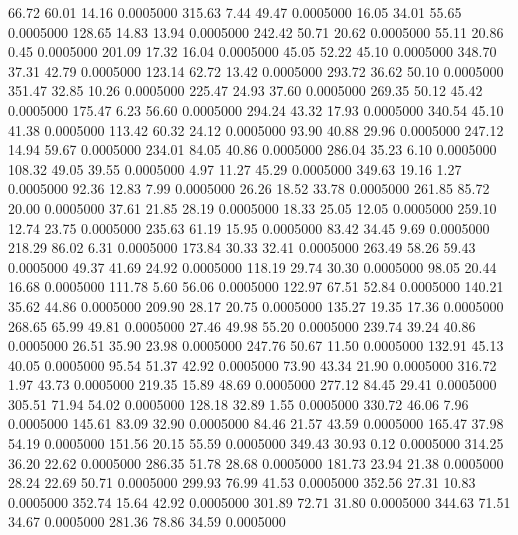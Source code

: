   66.72   60.01   14.16   0.0005000
 315.63    7.44   49.47   0.0005000
  16.05   34.01   55.65   0.0005000
 128.65   14.83   13.94   0.0005000
 242.42   50.71   20.62   0.0005000
  55.11   20.86    0.45   0.0005000
 201.09   17.32   16.04   0.0005000
  45.05   52.22   45.10   0.0005000
 348.70   37.31   42.79   0.0005000
 123.14   62.72   13.42   0.0005000
 293.72   36.62   50.10   0.0005000
 351.47   32.85   10.26   0.0005000
 225.47   24.93   37.60   0.0005000
 269.35   50.12   45.42   0.0005000
 175.47    6.23   56.60   0.0005000
 294.24   43.32   17.93   0.0005000
 340.54   45.10   41.38   0.0005000
 113.42   60.32   24.12   0.0005000
  93.90   40.88   29.96   0.0005000
 247.12   14.94   59.67   0.0005000
 234.01   84.05   40.86   0.0005000
 286.04   35.23    6.10   0.0005000
 108.32   49.05   39.55   0.0005000
   4.97   11.27   45.29   0.0005000
 349.63   19.16    1.27   0.0005000
  92.36   12.83    7.99   0.0005000
  26.26   18.52   33.78   0.0005000
 261.85   85.72   20.00   0.0005000
  37.61   21.85   28.19   0.0005000
  18.33   25.05   12.05   0.0005000
 259.10   12.74   23.75   0.0005000
 235.63   61.19   15.95   0.0005000
  83.42   34.45    9.69   0.0005000
 218.29   86.02    6.31   0.0005000
 173.84   30.33   32.41   0.0005000
 263.49   58.26   59.43   0.0005000
  49.37   41.69   24.92   0.0005000
 118.19   29.74   30.30   0.0005000
  98.05   20.44   16.68   0.0005000
 111.78    5.60   56.06   0.0005000
 122.97   67.51   52.84   0.0005000
 140.21   35.62   44.86   0.0005000
 209.90   28.17   20.75   0.0005000
 135.27   19.35   17.36   0.0005000
 268.65   65.99   49.81   0.0005000
  27.46   49.98   55.20   0.0005000
 239.74   39.24   40.86   0.0005000
  26.51   35.90   23.98   0.0005000
 247.76   50.67   11.50   0.0005000
 132.91   45.13   40.05   0.0005000
  95.54   51.37   42.92   0.0005000
  73.90   43.34   21.90   0.0005000
 316.72    1.97   43.73   0.0005000
 219.35   15.89   48.69   0.0005000
 277.12   84.45   29.41   0.0005000
 305.51   71.94   54.02   0.0005000
 128.18   32.89    1.55   0.0005000
 330.72   46.06    7.96   0.0005000
 145.61   83.09   32.90   0.0005000
  84.46   21.57   43.59   0.0005000
 165.47   37.98   54.19   0.0005000
 151.56   20.15   55.59   0.0005000
 349.43   30.93    0.12   0.0005000
 314.25   36.20   22.62   0.0005000
 286.35   51.78   28.68   0.0005000
 181.73   23.94   21.38   0.0005000
  28.24   22.69   50.71   0.0005000
 299.93   76.99   41.53   0.0005000
 352.56   27.31   10.83   0.0005000
 352.74   15.64   42.92   0.0005000
 301.89   72.71   31.80   0.0005000
 344.63   71.51   34.67   0.0005000
 281.36   78.86   34.59   0.0005000
